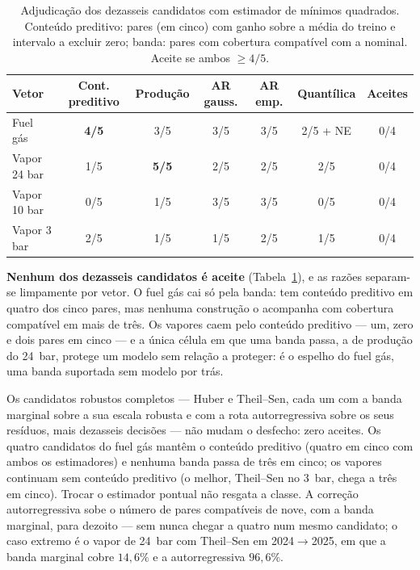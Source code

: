 \begin{table}[htbp]
  \centering
  \caption[Critério de aceitação: candidatos de mínimos quadrados]{Adjudicação
  dos dezasseis candidatos com estimador de mínimos quadrados. Conteúdo
  preditivo: pares (em cinco) com ganho sobre a média do treino e intervalo a
  excluir zero; banda: pares com cobertura compatível com a nominal. Aceite
  se ambos $\geq 4/5$.}
  \label{tab:gate}
  \small
  \begin{tabular}{lcccccc}
    \toprule
    Vetor & Cont. preditivo & Produção & AR gauss. & AR emp. & Quantílica & Aceites \\
    \midrule
    Fuel gás     & \textbf{4/5} & 3/5 & 3/5 & 3/5 & 2/5 + NE & 0/4 \\
    Vapor 24 bar & 1/5 & \textbf{5/5} & 2/5 & 2/5 & 2/5 & 0/4 \\
    Vapor 10 bar & 0/5 & 1/5 & 3/5 & 3/5 & 0/5 & 0/4 \\
    Vapor 3 bar  & 2/5 & 1/5 & 1/5 & 2/5 & 1/5 & 0/4 \\
    \bottomrule
  \end{tabular}
\end{table}

\textbf{Nenhum dos dezasseis candidatos é aceite} (Tabela~\ref{tab:gate}), e
as razões separam-se limpamente por vetor. O fuel gás cai só pela banda:
tem conteúdo preditivo em quatro dos cinco pares, mas nenhuma construção o
acompanha com cobertura compatível em mais de três. Os vapores caem pelo
conteúdo preditivo --- um, zero e dois pares em cinco --- e a única célula
em que uma banda passa, a de produção do 24~bar, protege um modelo sem
relação a proteger: é o espelho do fuel gás, uma banda suportada sem modelo
por trás.

Os candidatos robustos completos --- Huber e Theil--Sen, cada um com a banda
marginal sobre a sua escala robusta e com a rota autorregressiva sobre os
seus resíduos, mais dezasseis decisões --- não mudam o desfecho: zero
aceites. Os quatro candidatos do fuel gás mantêm o conteúdo preditivo
(quatro em cinco com ambos os estimadores) e nenhuma banda passa de três em
cinco; os vapores continuam sem conteúdo preditivo (o melhor, Theil--Sen no
3~bar, chega a três em cinco). Trocar o estimador pontual não resgata a
classe. A correção autorregressiva sobe o número de pares compatíveis de
nove, com a banda marginal, para dezoito --- sem nunca chegar a quatro num
mesmo candidato; o caso extremo é o vapor de 24~bar com Theil--Sen em
2024${\to}$2025, em que a banda marginal cobre $14{,}6\%$ e a autorregressiva
$96{,}6\%$.

